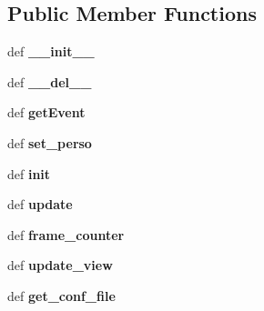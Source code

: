 \subsection*{\-Public \-Member \-Functions}
\begin{DoxyCompactItemize}
\item 
\hypertarget{classinterface_1_1pygamecli_1_1_client_a4472ac4b9b9fdf3f3ffa823cc0ec802d}{def {\bfseries \-\_\-\-\_\-init\-\_\-\-\_\-}}\label{classinterface_1_1pygamecli_1_1_client_a4472ac4b9b9fdf3f3ffa823cc0ec802d}

\item 
\hypertarget{classinterface_1_1pygamecli_1_1_client_ac80a9a1d9f3baa16bd52eed1875ec1e9}{def {\bfseries \-\_\-\-\_\-del\-\_\-\-\_\-}}\label{classinterface_1_1pygamecli_1_1_client_ac80a9a1d9f3baa16bd52eed1875ec1e9}

\item 
\hypertarget{classinterface_1_1pygamecli_1_1_client_ae958c1468bdab4c66913bb54bdb7cf9f}{def {\bfseries get\-Event}}\label{classinterface_1_1pygamecli_1_1_client_ae958c1468bdab4c66913bb54bdb7cf9f}

\item 
\hypertarget{classinterface_1_1pygamecli_1_1_client_a9b6826bca386c136ab018ed86371fd18}{def {\bfseries set\-\_\-perso}}\label{classinterface_1_1pygamecli_1_1_client_a9b6826bca386c136ab018ed86371fd18}

\item 
\hypertarget{classinterface_1_1pygamecli_1_1_client_af359e0ff9462666fad74f25339b47f89}{def {\bfseries init}}\label{classinterface_1_1pygamecli_1_1_client_af359e0ff9462666fad74f25339b47f89}

\item 
\hypertarget{classinterface_1_1pygamecli_1_1_client_a09519388ef07cdfc01ff6fc2b127aa86}{def {\bfseries update}}\label{classinterface_1_1pygamecli_1_1_client_a09519388ef07cdfc01ff6fc2b127aa86}

\item 
\hypertarget{classinterface_1_1pygamecli_1_1_client_a50fac3d1fced530d373c7ea9bd8d37c3}{def {\bfseries frame\-\_\-counter}}\label{classinterface_1_1pygamecli_1_1_client_a50fac3d1fced530d373c7ea9bd8d37c3}

\item 
\hypertarget{classinterface_1_1pygamecli_1_1_client_ab35e5031ac58f6ea79e221da713e6e80}{def {\bfseries update\-\_\-view}}\label{classinterface_1_1pygamecli_1_1_client_ab35e5031ac58f6ea79e221da713e6e80}

\item 
\hypertarget{classinterface_1_1pygamecli_1_1_client_a4450a249f1987b7b86db64655d36b256}{def {\bfseries get\-\_\-conf\-\_\-file}}\label{classinterface_1_1pygamecli_1_1_client_a4450a249f1987b7b86db64655d36b256}


\end{DoxyCompactItemize}
